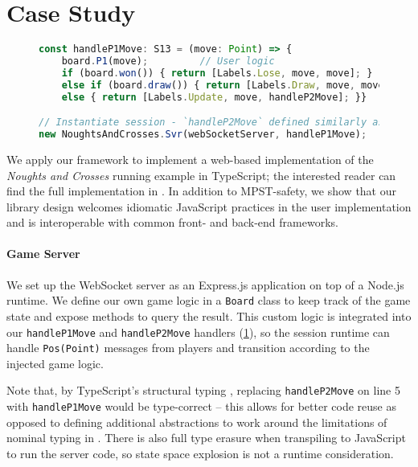 \section{Case Study}
\label{section:example}

\begin{figure}
\begin{lstlisting}[language=JavaScript, tabsize=4]
const handleP1Move: S13 = (move: Point) => {
	board.P1(move);			// User logic
	if (board.won()) { return [Labels.Lose, move, move]; }
	else if (board.draw()) { return [Labels.Draw, move, move]; }
	else { return [Labels.Update, move, handleP2Move]; }}

// Instantiate session - `handleP2Move` defined similarly as S18
new NoughtsAndCrosses.Svr(webSocketServer, handleP1Move);
\end{lstlisting}
\label{lst:svrprotocol}
\end{figure}

We apply our framework to implement a web-based implementation of the
\textit{Noughts and Crosses} running example in TypeScript;
the interested reader can find the full implementation in
\cite{NoughtsAndCrosses}.
In addition to MPST-safety, we show that our library design welcomes idiomatic
JavaScript practices in the user implementation and is interoperable with
common front- and back-end frameworks.

\paragraph{Game Server}
We set up the WebSocket server as an Express.js \cite{ExpressJS}
application on top of a Node.js \cite{NodeJS} runtime.
We define our own game logic in a \texttt{Board} class to keep track of the
game state and expose methods to query the result.
This custom logic is integrated into our \texttt{handleP1Move} and
\texttt{handleP2Move} handlers (\cref{lst:svrprotocol}), so the session runtime
can handle \texttt{Pos(Point)} messages from players and transition according
to the injected game logic.

Note that, by TypeScript's structural typing \cite{TypeScriptSpec}, replacing
\texttt{handleP2Move} on line 5 with \texttt{handleP1Move} would be
type-correct -- this allows for better code reuse as opposed to defining
additional abstractions to work around the limitations of nominal typing in
\cite{Hybrid2016}.
There is also full type erasure when transpiling to JavaScript to run the
server code, so state space explosion is not a runtime consideration.

